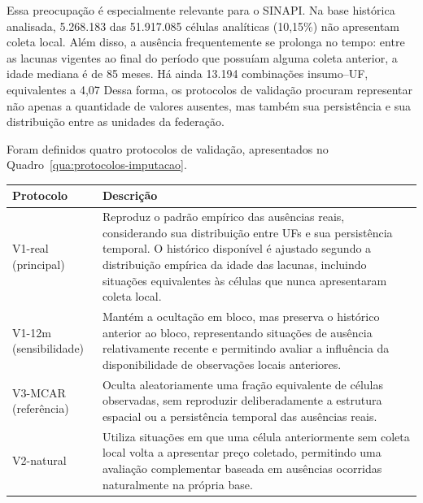 Essa preocupação é especialmente relevante para o SINAPI. Na base histórica analisada, 5.268.183 das 51.917.085 células 
analíticas (10,15\%) não apresentam coleta local. Além disso, a ausência frequentemente se prolonga no tempo: entre as lacunas 
vigentes ao final do período que possuíam alguma coleta anterior, a idade mediana é de 85 meses. Há ainda 13.194 combinações 
insumo--UF, equivalentes a 4,07%
Dessa forma, os protocolos de validação procuram representar não apenas a quantidade de valores ausentes, mas também sua 
persistência e sua distribuição entre as unidades da federação.

Foram definidos quatro protocolos de validação, apresentados no Quadro~\ref{qua:protocolos-imputacao}.

\begin{quadro}[htb] 
    \caption{Protocolos de validação do estudo de imputação} 
    \label{qua:protocolos-imputacao} 
    \centering 
    \begin{tabular}{p{} p{}} 
        \toprule 
        \textbf{Protocolo} & \textbf{Descrição} 
        \\ 
        \midrule 
        V1-real (principal) 
        & 
        Reproduz o padrão empírico das ausências reais, considerando sua distribuição entre UFs e sua persistência temporal. 
        O histórico disponível é ajustado segundo a distribuição empírica da idade das lacunas, incluindo situações equivalentes 
        às células que nunca apresentaram coleta local. 
        \\ 
        \addlinespace 
        V1-12m (sensibilidade) 
        & 
        Mantém a ocultação em bloco, mas preserva o histórico anterior ao bloco, representando situações de ausência 
        relativamente recente e permitindo avaliar a influência da disponibilidade de observações locais anteriores. 
        \\ 
        \addlinespace V3-MCAR (referência) 
        & 
        Oculta aleatoriamente uma fração equivalente de células observadas, sem reproduzir deliberadamente a estrutura espacial 
        ou a persistência temporal das ausências reais. 
        \\ 
        \addlinespace 
        V2-natural 
        & 
        Utiliza situações em que uma célula anteriormente sem coleta local volta a apresentar preço coletado, permitindo 
        uma avaliação complementar baseada em ausências ocorridas naturalmente na própria base. 
        \\ 
        \bottomrule 
    \end{tabular} 
     \end{quadro}

